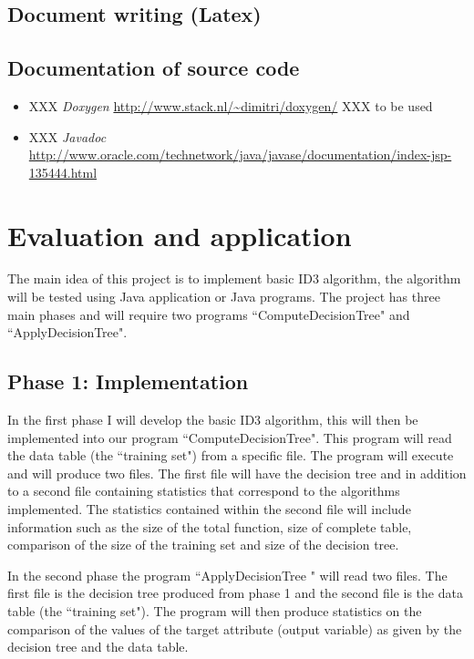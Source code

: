 \documentclass{article}
\begin{document}
\subsection{Document writing (Latex)}
\label{sec:latex}

\subsection{Documentation of source code}
\label{sec:documentsource}

\begin{itemize}
\item XXX \textit{Doxygen} \url{http://www.stack.nl/~dimitri/doxygen/} XXX to be used
\item XXX \textit{Javadoc} \url{http://www.oracle.com/technetwork/java/javase/documentation/index-jsp-135444.html}
\end{itemize}





\section{Evaluation and application}
\label{sec:eval}

The main idea of this project is to implement basic ID3 algorithm, the algorithm will be tested using Java application or Java programs. The project has three main phases and will require two programs ``ComputeDecisionTree" and ``ApplyDecisionTree". 


\subsection{Phase 1: Implementation}
\label{sec:phase1}

In the first phase I will develop the basic ID3 algorithm, this will then be implemented into our program ``ComputeDecisionTree". This program will read the data table (the ``training set") from a specific file. The program will execute and will produce two files. The first file will have the decision tree and in addition to a second file containing statistics that correspond to the algorithms implemented. The statistics contained within the second file will 
include information such as the size of the total function, size of complete table, comparison of the size of the training set and size of the decision tree.

In the second phase the program ``ApplyDecisionTree " will read two files. The first file is the decision tree produced from phase 1 and the second file is the data table (the ``training set"). The program will then produce statistics on the comparison of the values of the target attribute (output variable) as given by the decision tree and the data table.
\end{document}
